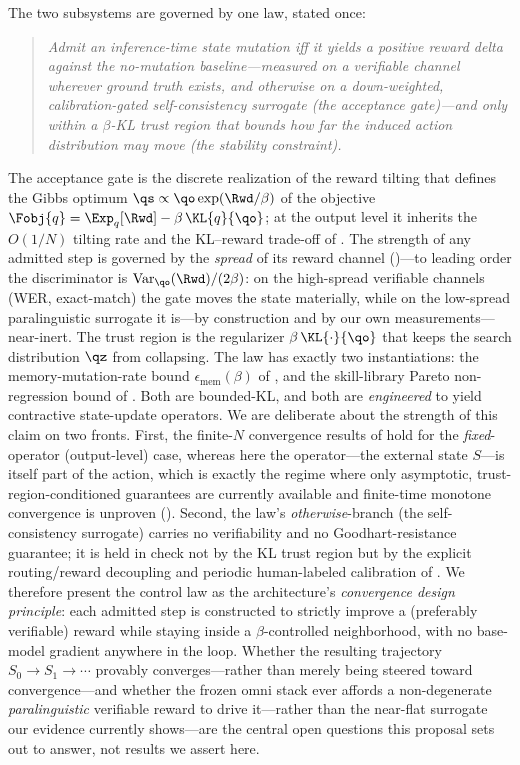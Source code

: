 The two subsystems are governed by one law, stated once:
\begin{quote}
\emph{Admit an inference-time state mutation iff it yields a positive reward delta against the no-mutation baseline---measured on a verifiable channel wherever ground truth exists, and otherwise on a down-weighted, calibration-gated self-consistency surrogate (the acceptance gate)---and only within a $\beta$-KL trust region that bounds how far the induced action distribution may move (the stability constraint).}
\end{quote}
The acceptance gate is the discrete realization of the reward tilting that defines the Gibbs optimum $\qs \propto \qo\exp(\Rwd/\beta)$ of the objective $\Fobj{q} = \Exp_q[\Rwd] - \beta\,\KL{q}{\qo}$; at the output level it inherits the $O(1/N)$ tilting rate and the KL--reward trade-off of . The strength of any admitted step is governed by the \emph{spread} of its reward channel ()---to leading order the discriminator is $\operatorname{Var}_{\qo}(\Rwd)/(2\beta)$: on the high-spread verifiable channels (WER, exact-match) the gate moves the state materially, while on the low-spread paralinguistic surrogate it is---by construction and by our own measurements---near-inert. The trust region is the regularizer $\beta\,\KL{\cdot}{\qo}$ that keeps the search distribution $\qz$ from collapsing. The law has exactly two instantiations: the memory-mutation-rate bound $\epsilon_{\mathrm{mem}}(\beta)$ of , and the skill-library Pareto non-regression bound of . Both are bounded-KL, and both are \emph{engineered} to yield contractive state-update operators. We are deliberate about the strength of this claim on two fronts. First, the finite-$N$ convergence results of  hold for the \emph{fixed}-operator (output-level) case, whereas here the operator---the external state $S$---is itself part of the action, which is exactly the regime where only asymptotic, trust-region-conditioned guarantees are currently available and finite-time monotone convergence is unproven (). Second, the law's \emph{otherwise}-branch (the self-consistency surrogate) carries no verifiability and no Goodhart-resistance guarantee; it is held in check not by the KL trust region but by the explicit routing/reward decoupling and periodic human-labeled calibration of . We therefore present the control law as the architecture's \emph{convergence design principle}: each admitted step is constructed to strictly improve a (preferably verifiable) reward while staying inside a $\beta$-controlled neighborhood, with no base-model gradient anywhere in the loop. Whether the resulting trajectory $S_0 \to S_1 \to \cdots$ provably converges---rather than merely being steered toward convergence---and whether the frozen omni stack ever affords a non-degenerate \emph{paralinguistic} verifiable reward to drive it---rather than the near-flat surrogate our evidence currently shows---are the central open questions this proposal sets out to answer, not results we assert here.
